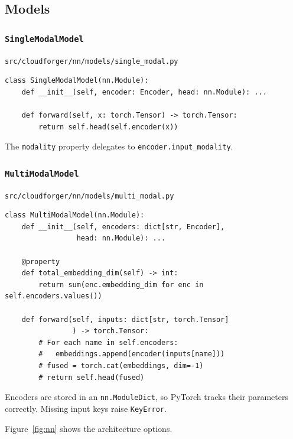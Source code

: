 \documentclass[11pt, a4paper]{article}
\newcommand{\code}[1]{\texttt{#1}}
\newcommand{\pyfile}[1]{\texttt{\small #1}}
\newcommand{\typename}[1]{\textbf{\texttt{#1}}}
\begin{document}
\subsection{Models}

\subsubsection{\typename{SingleModalModel}}
\pyfile{src/cloudforger/nn/models/single\_modal.py}

\begin{lstlisting}
class SingleModalModel(nn.Module):
    def __init__(self, encoder: Encoder, head: nn.Module): ...

    def forward(self, x: torch.Tensor) -> torch.Tensor:
        return self.head(self.encoder(x))
\end{lstlisting}

The \code{modality} property delegates to \code{encoder.input\_modality}.

\subsubsection{\typename{MultiModalModel}}
\pyfile{src/cloudforger/nn/models/multi\_modal.py}

\begin{lstlisting}
class MultiModalModel(nn.Module):
    def __init__(self, encoders: dict[str, Encoder],
                 head: nn.Module): ...

    @property
    def total_embedding_dim(self) -> int:
        return sum(enc.embedding_dim for enc in self.encoders.values())

    def forward(self, inputs: dict[str, torch.Tensor]
                ) -> torch.Tensor:
        # For each name in self.encoders:
        #   embeddings.append(encoder(inputs[name]))
        # fused = torch.cat(embeddings, dim=-1)
        # return self.head(fused)
\end{lstlisting}

Encoders are stored in an \code{nn.ModuleDict}, so PyTorch tracks
their parameters correctly.
Missing input keys raise \code{KeyError}.

Figure~\ref{fig:nn} shows the architecture options.
\end{document}
